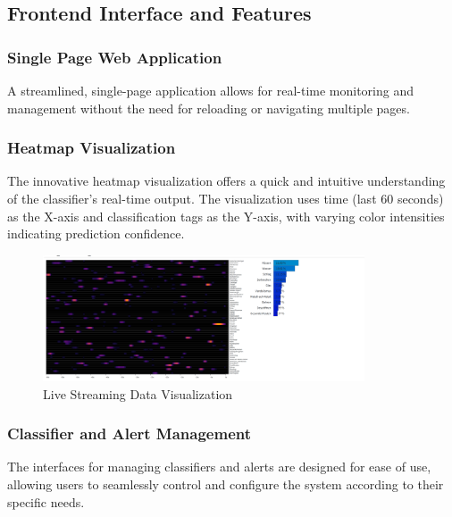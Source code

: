 \subsection{Frontend Interface and Features}

\subsubsection{Single Page Web Application}
A streamlined, single-page application allows for real-time monitoring and management without the need for reloading or navigating multiple pages.

\subsubsection{Heatmap Visualization}
The innovative heatmap visualization offers a quick and intuitive understanding of the classifier's real-time output. The visualization uses time (last 60 seconds) as the X-axis and classification tags as the Y-axis, with varying color intensities indicating prediction confidence.

\begin{figure}[htbp]
  \centering
  \includegraphics[width=0.85\textwidth]{Pictures/heatmap}
  \caption{\label{fig:heatmap}Live Streaming Data Visualization}
\end{figure}

\subsubsection{Classifier and Alert Management}
The interfaces for managing classifiers and alerts are designed for ease of use, allowing users to seamlessly control and configure the system according to their specific needs.

